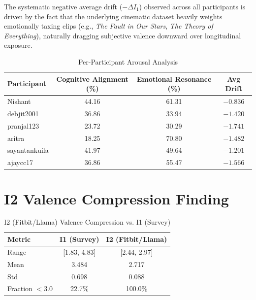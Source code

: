 \documentclass[11pt, a4paper]{report}
\begin{document}
The systematic negative average drift ($-\Delta I_1$) observed across all participants is driven by the fact that the underlying cinematic dataset heavily weights emotionally taxing clips (e.g., \textit{The Fault in Our Stars}, \textit{The Theory of Everything}), naturally dragging subjective valence downward over longitudinal exposure.

\begin{table}[H]
    \centering
    \small
    \caption{Per-Participant Arousal Analysis}
    \label{tab:participant-aro}
    \begin{tabular}{@{}lccc@{}}
        \toprule
        \textbf{Participant} & \textbf{Cognitive Alignment (\%)} & \textbf{Emotional Resonance (\%)} & \textbf{Avg Drift} \\
        \midrule
        Nishant & 44.16 & 61.31 & $-0.836$ \\
        debjit2001 & 36.86 & 33.94 & $-1.420$ \\
        pranjal123 & 23.72 & 30.29 & $-1.741$ \\
        aritra & 18.25 & 70.80 & $-1.482$ \\
        sayantankuila & 41.97 & 49.64 & $-1.201$ \\
        ajaycc17 & 36.86 & 55.47 & $-1.566$ \\
        \bottomrule
    \end{tabular}
\end{table}


\section{I2 Valence Compression Finding}

\begin{table}[H]
    \centering
    \small
    \caption{I2 (Fitbit/Llama) Valence Compression vs. I1 (Survey)}
    \label{tab:compression}
    \begin{tabular}{@{}lcc@{}}
        \toprule
        \textbf{Metric} & \textbf{I1 (Survey)} & \textbf{I2 (Fitbit/Llama)} \\
        \midrule
        Range & [1.83, 4.83] & [2.44, 2.97] \\
        Mean & 3.484 & 2.717 \\
        Std & 0.698 & 0.088 \\
        Fraction $< 3.0$ & 22.7\% & 100.0\% \\
        \bottomrule
    \end{tabular}
\end{table}
\end{document}
